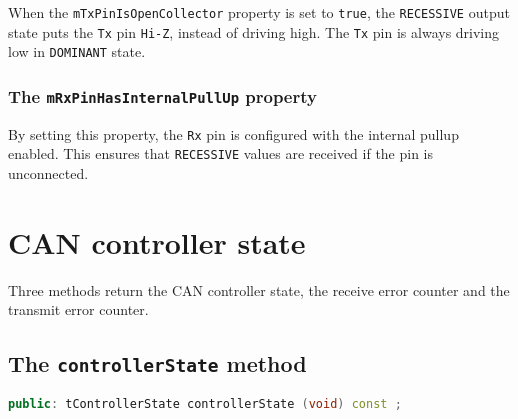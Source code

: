 \documentclass[10pt, a4paper, obeyspaces, openany]{extarticle}
\newcommand \sectionLabel[2]{\section{#1}\label{sec:#2}}
\newcommand \subsubsectionLabel[2]{\subsubsection{#1}\label{subsubsec:#2}}
\newcommand\labelTableau[1]{\label{tab:#1}}
\begin{document}
When the \texttt{mTxPinIsOpenCollector} property is set to \texttt{true}, the \texttt{RECESSIVE} output state puts the \texttt{Tx} pin \texttt{Hi-Z}, instead of driving high. The \texttt{Tx} pin is always driving low in \texttt{DOMINANT} state.

\begin{table}[!ht]
  \onehalfspacing
  \centering
  \quad\quad\quad\quad\quad
  \caption{\texttt{Tx} pin output, following the \texttt{mTxPinIsOpenCollector} property setting}
  \labelTableau{tableTxPinState}
\end{table}



\subsubsectionLabel{The \texttt{mRxPinHasInternalPullUp} property}{RxPinHasInternalPullUp}

By setting this property, the \texttt{Rx} pin is configured with the internal pullup enabled. This ensures that \texttt{RECESSIVE} values are received if the pin is unconnected.






\sectionLabel{CAN controller state}{canControllerState}

Three methods return the CAN controller state, the receive error counter and the transmit error counter.

\subsection{The \texttt{controllerState} method}

{ \small\begin{lstlisting}[language=c++]
public: tControllerState controllerState (void) const ;
\end{lstlisting}}
\end{document}
